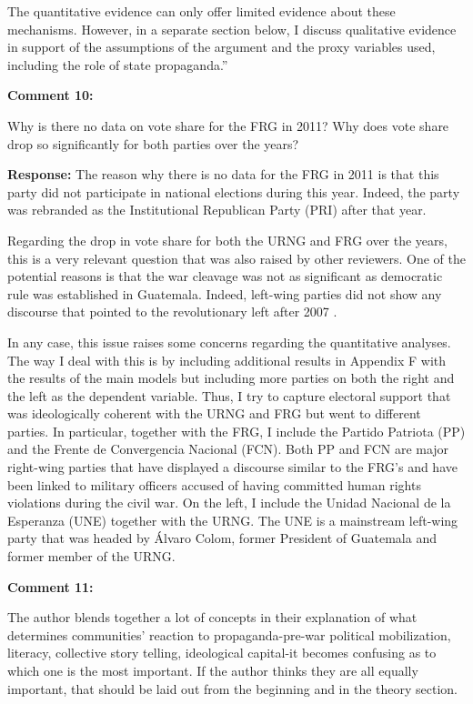 \documentclass[12pt, a4paper, notitlepage]{article}
\begin{document}
The quantitative evidence can only offer limited evidence about these mechanisms.
However, in a separate section below, I discuss qualitative evidence in support of the assumptions of the argument and the proxy variables used, including the role of state propaganda.''


\vspace{15pt}
\noindent\textbf{Comment 10:}
\begin{displayquote}
Why is there no data on vote share for the FRG in 2011? Why does vote share drop so significantly for both parties over the years?
\end{displayquote}

\noindent\textbf{Response:} The reason why there is no data for the FRG in 2011 is that this party did not participate in national elections during this year. Indeed, the party was rebranded as the Institutional Republican Party (PRI) after that year.

Regarding the drop in vote share for both the URNG and FRG over the years, this is a very relevant question that was also raised by other reviewers. One of the potential reasons is that the war cleavage was not as significant as democratic rule was established in Guatemala. Indeed, left-wing parties did not show any discourse that pointed to the revolutionary left after 2007 \citep{Ibarra:2008to}.

In any case, this issue raises some concerns regarding the quantitative analyses. The way I deal with this is by including additional results in Appendix F with the results of the main models but including more parties on both the right and the left as the dependent variable. Thus, I try to capture electoral support that was ideologically coherent with the URNG and FRG but went to different parties. In particular, together with the FRG, I include the Partido Patriota (PP) and the Frente de Convergencia Nacional (FCN).
Both PP and FCN are major right-wing parties that have displayed a discourse similar to the FRG's and have been linked to military officers accused of having committed human rights violations during the civil war.
On the left, I include the Unidad Nacional de la Esperanza (UNE) together with the URNG. The UNE is a mainstream left-wing party that was headed by Álvaro Colom, former President of Guatemala and former member of the URNG.

\vspace{15pt}
\noindent\textbf{Comment 11:}
\begin{displayquote}
The author blends together a lot of concepts in their explanation of what determines communities' reaction to propaganda-pre-war political mobilization, literacy, collective story telling, ideological capital-it becomes confusing as to which one is the most important. If the author thinks they are all equally important, that should be laid out from the beginning and in the theory section.
\end{displayquote}
\end{document}
